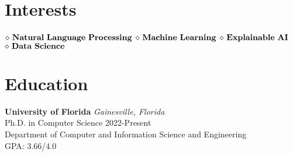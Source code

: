 \documentclass[a4paper,11pt]{article}
\begin{document}

\pagestyle{empty} %


\par{\par}
\bigskip
\section{Interests}
$\diamond {\bf \ Natural \ Language \ Processing}$
$\diamond {\bf \ Machine \ Learning}$
$\diamond {\bf \ Explainable\ AI}$  
$\diamond {\bf \ Data \ Science}$ 




\section{Education}
{{\bf University of Florida} \hfill {\em Gainesville, Florida} 
\\{\normalsize Ph.D. in Computer Science} \hfill
 2022-Present
 \\ \small Department of Computer and Information Science and Engineering \hfill $\;$
 \\{\normalsize GPA: 3.66/4.0} \hfill }
 
\end{document}
